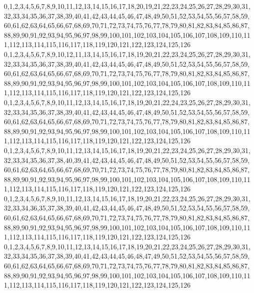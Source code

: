 \documentclass[12pt]{article}
\begin{document}
{0,1,2,3,4,5,6,7,8,9,10,11,12,13,14,15,16,17,18,20,19,21,22,23,24,25,26,27,28,29,30,31,32,33,34,35,36,37,38,39,40,41,42,43,44,45,46,47,48,49,50,51,52,53,54,55,56,57,58,59,60,61,62,63,64,65,66,67,68,69,70,71,72,73,74,75,76,77,78,79,80,81,82,83,84,85,86,87,88,89,90,91,92,93,94,95,96,97,98,99,100,101,102,103,104,105,106,107,108,109,110,111,112,113,114,115,116,117,118,119,120,121,122,123,124,125,126\\
0,1,2,3,4,5,6,7,8,9,10,12,11,13,14,15,16,17,18,19,20,21,22,23,24,25,26,27,28,29,30,31,32,33,34,35,36,37,38,39,40,41,42,43,44,45,46,47,48,49,50,51,52,53,54,55,56,57,58,59,60,61,62,63,64,65,66,67,68,69,70,71,72,73,74,75,76,77,78,79,80,81,82,83,84,85,86,87,88,89,90,91,92,93,94,95,96,97,98,99,100,101,102,103,104,105,106,107,108,109,110,111,112,113,114,115,116,117,118,119,120,121,122,123,124,125,126\\
0,1,2,3,4,5,6,7,8,9,10,11,12,13,14,15,16,17,18,19,20,21,22,24,23,25,26,27,28,29,30,31,32,33,34,35,36,37,38,39,40,41,42,43,44,45,46,47,48,49,50,51,52,53,54,55,56,57,58,59,60,61,62,63,64,65,66,67,68,69,70,71,72,73,74,75,76,77,78,79,80,81,82,83,84,85,86,87,88,89,90,91,92,93,94,95,96,97,98,99,100,101,102,103,104,105,106,107,108,109,110,111,112,113,114,115,116,117,118,119,120,121,122,123,124,125,126\\
0,1,2,3,4,5,6,7,8,9,10,11,12,13,14,15,16,17,18,19,20,21,22,23,24,25,26,27,28,29,30,31,32,33,34,35,36,37,38,40,39,41,42,43,44,45,46,47,48,49,50,51,52,53,54,55,56,57,58,59,60,61,62,63,64,65,66,67,68,69,70,71,72,73,74,75,76,77,78,79,80,81,82,83,84,85,86,87,88,89,90,91,92,93,94,95,96,97,98,99,100,101,102,103,104,105,106,107,108,109,110,111,112,113,114,115,116,117,118,119,120,121,122,123,124,125,126\\
0,1,2,3,4,5,6,7,8,9,10,11,12,13,14,15,16,17,18,19,20,21,22,23,24,25,26,27,28,29,30,31,32,33,34,36,35,37,38,39,40,41,42,43,44,45,46,47,48,49,50,51,52,53,54,55,56,57,58,59,60,61,62,63,64,65,66,67,68,69,70,71,72,73,74,75,76,77,78,79,80,81,82,83,84,85,86,87,88,89,90,91,92,93,94,95,96,97,98,99,100,101,102,103,104,105,106,107,108,109,110,111,112,113,114,115,116,117,118,119,120,121,122,123,124,125,126\\
0,1,2,3,4,5,6,7,8,9,10,11,12,13,14,15,16,17,18,19,20,21,22,23,24,25,26,27,28,29,30,31,32,33,34,35,36,37,38,39,40,41,42,43,44,45,46,48,47,49,50,51,52,53,54,55,56,57,58,59,60,61,62,63,64,65,66,67,68,69,70,71,72,73,74,75,76,77,78,79,80,81,82,83,84,85,86,87,88,89,90,91,92,93,94,95,96,97,98,99,100,101,102,103,104,105,106,107,108,109,110,111,112,113,114,115,116,117,118,119,120,121,122,123,124,125,126\\
}
\end{document}
